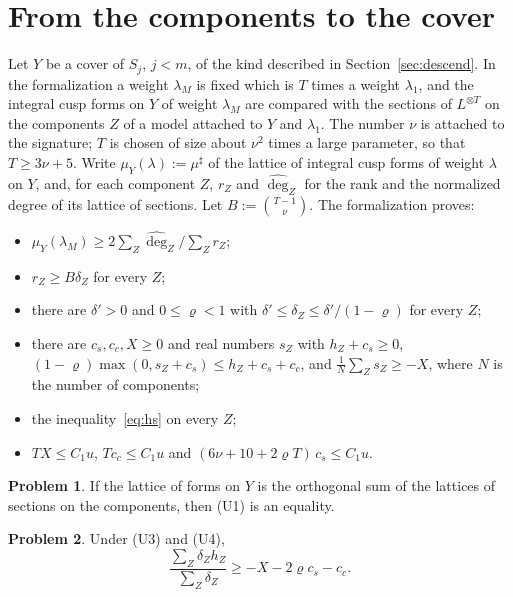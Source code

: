 \documentclass[reqno]{amsart}
\theoremstyle{definition}
\newtheorem{problem}{Problem}[section]
\theoremstyle{plain}
\theoremstyle{remark}
\newcommand{\mus}{\mu^\sharp}
\newcommand{\dg}{\widehat{\deg}}
\begin{document}
\section{From the components to the cover}\label{sec:cover}

Let \(Y\) be a cover of \(S_j\), \(j < m\), of the kind described in Section~\ref{sec:descend}.  In the formalization a weight \(\lambda_M\) is fixed which is \(T\) times a weight \(\lambda_1\), and the integral cusp forms on \(Y\) of weight \(\lambda_M\) are compared with the sections of \(L^{\otimes T}\) on the components \(Z\) of a model attached to \(Y\) and \(\lambda_1\).  The number \(\nu\) is attached to the signature; \(T\) is chosen of size about \(\nu^2\) times a large parameter, so that \(T \ge 3\nu + 5\).  Write \(\mu_Y(\lambda) := \mus\) of the lattice of integral cusp forms of weight \(\lambda\) on \(Y\), and, for each component \(Z\), \(r_Z\) and \(\dg_Z\) for the rank and the normalized degree of its lattice of sections.  Let \(B := \binom{T-1}{\nu}\).  The formalization proves:
\begin{itemize}
\item[(U1)] \(\mu_Y(\lambda_M) \ge 2\sum_Z\dg_Z\big/\sum_Zr_Z\);
\item[(U2)] \(r_Z \ge B\delta_Z\) for every \(Z\);
\item[(U3)] there are \(\delta' > 0\) and \(0 \le \varrho < 1\) with \(\delta' \le \delta_Z \le \delta'/(1-\varrho)\) for every \(Z\);
\item[(U4)] there are \(c_s, c_c, X \ge 0\) and real numbers \(s_Z\) with \(h_Z + c_s \ge 0\), \((1-\varrho)\max(0, s_Z + c_s) \le h_Z + c_s + c_c\), and \(\frac1N\sum_Zs_Z \ge -X\), where \(N\) is the number of components;
\item[(U5)] the inequality~\eqref{eq:hs} on every \(Z\);
\item[(U6)] \(TX \le C_1u\), \(Tc_c \le C_1u\) and \((6\nu + 10 + 2\varrho T)\,c_s \le C_1u\).
\end{itemize}

\begin{problem}\label{pr:sum-orth}
If the lattice of forms on \(Y\) is the orthogonal sum of the lattices of sections on the components, then (U1) is an equality.
\end{problem}

\begin{problem}\label{pr:weighted-mean}
Under (U3) and (U4),
\[
  \frac{\sum_Z\delta_Zh_Z}{\sum_Z\delta_Z} \ge -X - 2\varrho c_s - c_c .
\]
\end{problem}
\end{document}
